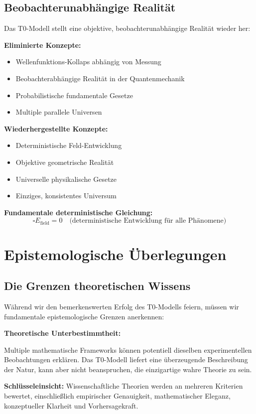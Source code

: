 \documentclass[12pt,a4paper]{report}
\begin{document}
	\subsection{Beobachterunabhängige Realität}
	\label{subsec:observer_independent_reality}
	
	Das T0-Modell stellt eine objektive, beobachterunabhängige Realität wieder her:
	
	\textbf{Eliminierte Konzepte:}
	\begin{itemize}
		\item Wellenfunktions-Kollaps abhängig von Messung
		\item Beobachterabhängige Realität in der Quantenmechanik
		\item Probabilistische fundamentale Gesetze
		\item Multiple parallele Universen
	\end{itemize}
	
	\textbf{Wiederhergestellte Konzepte:}
	\begin{itemize}
		\item Deterministische Feld-Entwicklung
		\item Objektive geometrische Realität
		\item Universelle physikalische Gesetze
		\item Einziges, konsistentes Universum
	\end{itemize}
	
	\textbf{Fundamentale deterministische Gleichung:}
	\begin{equation}
		\square E_{\text{field}} = 0 \quad \text{(deterministische Entwicklung für alle Phänomene)}
	\end{equation}
	
	\section{Epistemologische Überlegungen}
	\label{sec:epistemological_considerations}
	
	\subsection{Die Grenzen theoretischen Wissens}
	\label{subsec:limits_theoretical_knowledge}
	
	Während wir den bemerkenswerten Erfolg des T0-Modells feiern, müssen wir fundamentale epistemologische Grenzen anerkennen:
	
	\begin{tcolorbox}[colback=yellow!5!white,colframe=orange!75!black,title=Epistemologische Bescheidenheit]
		\textbf{Theoretische Unterbestimmtheit:}
		
		Multiple mathematische Frameworks können potentiell dieselben experimentellen Beobachtungen erklären. Das T0-Modell liefert eine überzeugende Beschreibung der Natur, kann aber nicht beanspruchen, die einzigartige wahre Theorie zu sein.
		
		\textbf{Schlüsseleinsicht:} Wissenschaftliche Theorien werden an mehreren Kriterien bewertet, einschließlich empirischer Genauigkeit, mathematischer Eleganz, konzeptueller Klarheit und Vorhersagekraft.
	\end{tcolorbox}
	
\end{document}
